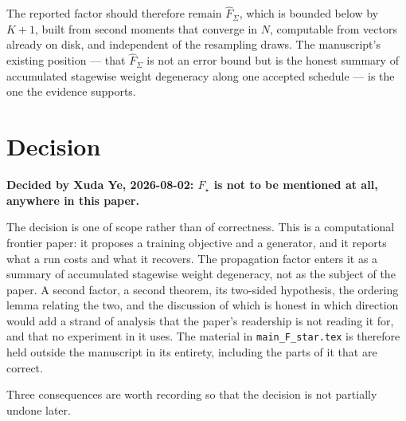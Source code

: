 \documentclass[11pt]{article}
\theoremstyle{plain}
\begin{document}
The reported factor should therefore remain $\hat F_\Sigma$, which is bounded
below by $K+1$, built from second moments that converge in $N$, computable from
vectors already on disk, and independent of the resampling draws. The
manuscript's existing position --- that $\hat F_\Sigma$ is not an error bound but
is the honest summary of accumulated stagewise weight degeneracy along one
accepted schedule --- is the one the evidence supports.

\section{Decision}

\noindent\textbf{Decided by Xuda Ye, 2026-08-02: $F_\star$ is not to be
mentioned at all, anywhere in this paper.}

The decision is one of scope rather than of correctness. This is a
computational frontier paper: it proposes a training objective and a generator,
and it reports what a run costs and what it recovers. The propagation factor
enters it as a summary of accumulated stagewise weight degeneracy, not as the
subject of the paper. A second factor, a second theorem, its two-sided
hypothesis, the ordering lemma relating the two, and the discussion of which is
honest in which direction would add a strand of analysis that the paper's
readership is not reading it for, and that no experiment in it uses. The
material in \texttt{main\_F\_star.tex} is therefore held outside the
manuscript in its entirety, including the parts of it that are correct.

Three consequences are worth recording so that the decision is not partially
undone later.
\end{document}
